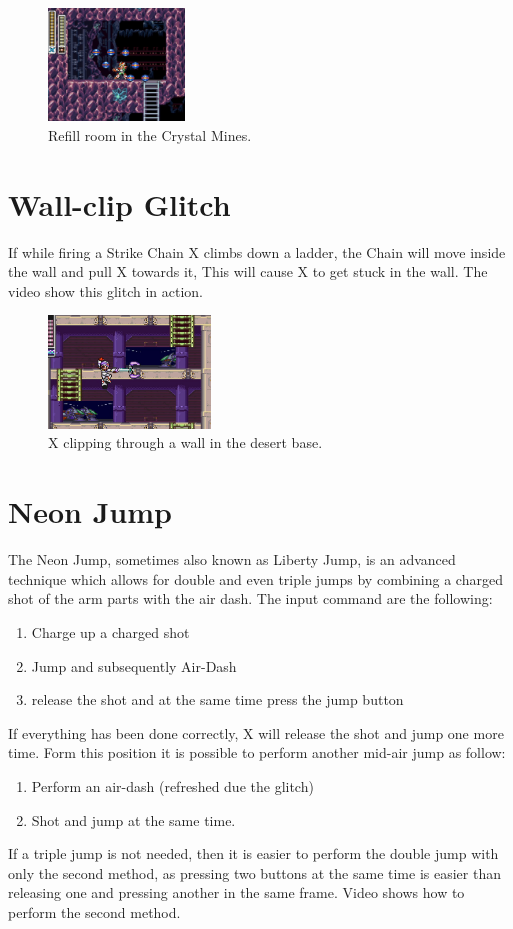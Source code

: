 \begin{itemize}
	\begin{figure}[htp]
		\centering
		\includegraphics[height=3cm]{figures/X2/Crystal_snail/Crystal_farming_spot.png}
		\caption{Refill room in the Crystal Mines.}
	\end{figure}
\end{itemize}

\section{Wall-clip Glitch}
If while firing a Strike Chain X climbs down a ladder, the Chain will move inside the wall and pull X towards it, This will cause X to get stuck in the wall. The video  show this glitch in action.

\begin{figure}[htp]
	\centering
	\includegraphics[height=3cm]{figures/X2/Miscs/Chain_clip.jpg}
	\caption{X clipping through a wall in the desert base.}
\end{figure}

\section{Neon Jump}\label{Neon_jump}
The Neon Jump, sometimes also known as Liberty Jump, is an advanced technique which allows for double and even triple jumps by combining a charged shot of the arm parts with the air dash. The input command are the following:
\begin{enumerate}
	\item Charge up a charged shot
	\item Jump and subsequently Air-Dash 
	\item release the shot and at the same time press the jump button
\end{enumerate}
If everything has been done correctly, X will release the shot and jump one more time. Form this position it is possible to perform another mid-air jump as follow:
\begin{enumerate}
	\item Perform an air-dash (refreshed due the glitch)
	\item Shot and jump at the same time.
\end{enumerate}
If a triple jump is not needed, then it is easier to perform the double jump with only the second method, as pressing two buttons at the same time is easier than releasing one and pressing another in the same frame. Video  shows how to perform the second method.


